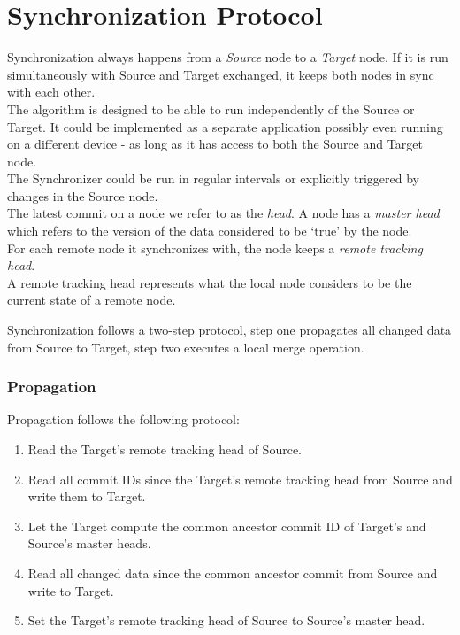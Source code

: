 
\section{Synchronization Protocol}
\label{sec:main.protocol}
Synchronization always happens from a \emph{Source} node to a \emph{Target} node.
If it is run simultaneously with Source and Target exchanged, it keeps both nodes in sync with each other.\\
The algorithm is designed to be able to run independently of the Source or Target.
It could be implemented as a separate application possibly even running on a different device - as long as it has access to both the Source and Target node.\\
The Synchronizer could be run in regular intervals or explicitly triggered by changes in the Source node.\\

The latest commit on a node we refer to as the \emph{head}.
A node has a \emph{master head} which refers to the version of the data considered to be `true' by the node.\\
For each remote node it synchronizes with, the node keeps a \emph{remote tracking head}.\\
A remote tracking head represents what the local node considers to be the current state of a remote node.

Synchronization follows a two-step protocol, step one propagates all changed data from Source to Target, step two executes a local merge operation.

\subsubsection{Propagation}
Propagation follows the following protocol:

\begin{enumerate}
\item Read the Target's remote tracking head of Source.
\item Read all commit IDs since the Target's remote tracking head from Source and write them to Target.
\item Let the Target compute the common ancestor commit ID of Target's and Source's master heads.
\item Read all changed data since the common ancestor commit from Source and write to Target.
\item Set the Target's remote tracking head of Source to Source's master head.
\end{enumerate}

